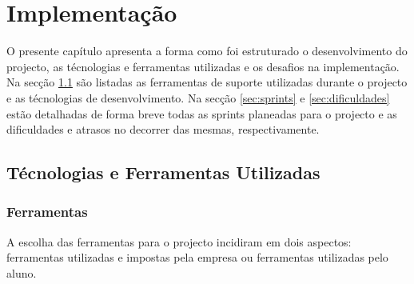 \chapter{Implementação}
\label{sec:implementacao}

O presente capítulo apresenta a forma como foi estruturado o desenvolvimento do projecto, as técnologias e ferramentas utilizadas e os desafios na implementação. Na secção \ref{sec:ferramentas} são listadas as ferramentas de suporte utilizadas durante o projecto e as técnologias de desenvolvimento. Na secção \ref{sec:sprints} e \ref{sec:dificuldades} estão detalhadas de forma breve todas as sprints planeadas para o projecto e as dificuldades e atrasos no decorrer das mesmas, respectivamente.



\section{Técnologias e Ferramentas Utilizadas}
\label{sec:ferramentas}


\subsection{Ferramentas}

A escolha das ferramentas para o projecto incidiram em dois aspectos: ferramentas utilizadas e impostas pela empresa ou ferramentas utilizadas pelo aluno.

